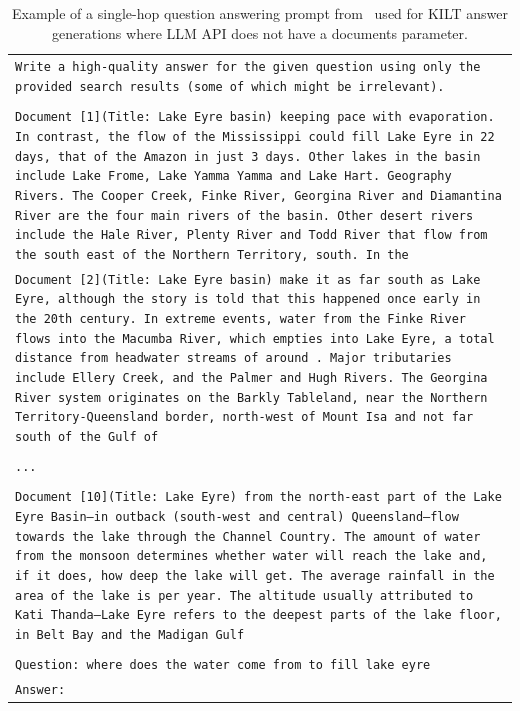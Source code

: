 \documentclass[11pt]{article}
\begin{document}
\begin{table}[ht]
    \centering
    \small
    \begin{tabular}{>{\raggedright\arraybackslash\tt}p{\textwidth}<{}}
        \toprule
        Write a high-quality answer for the given question using only the provided search results (some of which might be irrelevant).
\\
\\
Document [1](Title: Lake Eyre basin) keeping pace with evaporation. In contrast, the flow of the Mississippi could fill Lake Eyre in 22 days, that of the Amazon in just 3 days.
Other lakes in the basin include Lake Frome, Lake Yamma Yamma and Lake Hart.
Geography Rivers.
The Cooper Creek, Finke River, Georgina River and Diamantina River are the four main rivers of the basin. Other desert rivers include the Hale River, Plenty River and Todd River that flow from the south east of the Northern Territory, south. In the\\
Document [2](Title: Lake Eyre basin) make it as far south as Lake Eyre, although the story is told that this happened once early in the 20th century. In extreme events, water from the Finke River flows into the Macumba River, which empties into Lake Eyre, a total distance from headwater streams of around . Major tributaries include Ellery Creek, and the Palmer and Hugh Rivers.
The Georgina River system originates on the Barkly Tableland, near the Northern Territory-Queensland border, north-west of Mount Isa and not far south of the Gulf of\\
\\
...
\\
\\
Document [10](Title: Lake Eyre) from the north-east part of the Lake Eyre Basin—in outback (south-west and central) Queensland—flow towards the lake through the Channel Country. The amount of water from the monsoon determines whether water will reach the lake and, if it does, how deep the lake will get. The average rainfall in the area of the lake is per year.
The altitude usually attributed to Kati Thanda–Lake Eyre refers to the deepest parts of the lake floor, in Belt Bay and the Madigan Gulf
\\
\\
Question: where does the water come from to fill lake eyre
\\Answer:
\\
        \bottomrule
    \end{tabular}
    \caption{
        Example of a single-hop question answering prompt from~\citet{liu2024lost} used for KILT answer generations where LLM API does not have a documents parameter.
    }
    \label{tab:litm_prompt}
\end{table}
\end{document}
